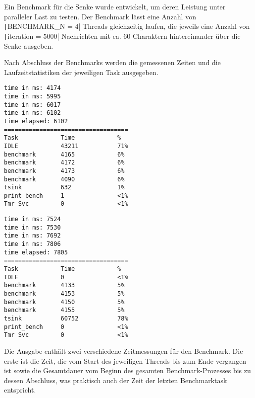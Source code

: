Ein Benchmark für die Senke wurde entwickelt, um deren Leistung unter paralleler
Last zu testen. Der Benchmark lässt eine Anzahl von
\texttt|BENCHMARK_N = 4| Threads gleichzeitig laufen, die jeweils eine
Anzahl von \texttt|iteration = 5000| Nachrichten mit ca. 60 Charaktern
hintereinander über die Senke ausgeben.

Nach Abschluss der Benchmarks werden die gemessenen Zeiten und die
Laufzeitstatistiken der jeweiligen Task ausgegeben.

\begin{minipage}[t]{0.5\textwidth}
    \begin{code}
        \begin{verbatim}
time in ms: 4174
time in ms: 5995
time in ms: 6017
time in ms: 6102
time elapsed: 6102
===================================
Task            Time            %
IDLE            43211           71%
benchmark       4165            6%
benchmark       4172            6%
benchmark       4173            6%
benchmark       4090            6%
tsink           632             1%
print_bench     1               <1%
Tmr Svc         0               <1%
    \end{verbatim}
    \end{code}
\end{minipage}
\hfill
\begin{minipage}[t]{0.5\textwidth}
    \begin{code}
        \begin{verbatim}
time in ms: 7524
time in ms: 7530
time in ms: 7692
time in ms: 7806
time elapsed: 7805
===================================
Task            Time            %
IDLE            0               <1%
benchmark       4133            5%
benchmark       4153            5%
benchmark       4150            5%
benchmark       4155            5%
tsink           60752           78%
print_bench     0               <1%
Tmr Svc         0               <1%
    \end{verbatim}
    \end{code}
\end{minipage}

Die Ausgabe enthält zwei verschiedene Zeitmessungen für den Benchmark. Die erste
ist die Zeit, die vom Start des jeweiligen Threads bis zum Ende vergangen ist
sowie die Gesamtdauer vom Beginn des gesamten Benchmark-Prozesses bis zu dessen
Abschluss, was praktisch auch der Zeit der letzten Benchmarktask entspricht.


